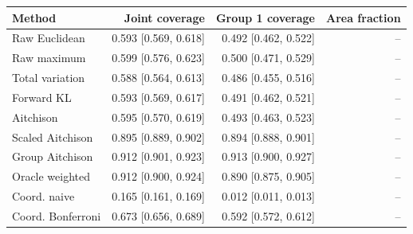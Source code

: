 \begin{tabular}{lrrr}
\toprule
Method & Joint coverage & Group 1 coverage & Area fraction \\
\midrule
Raw Euclidean & 0.593 [0.569, 0.618] & 0.492 [0.462, 0.522] & -- \\
Raw maximum & 0.599 [0.576, 0.623] & 0.500 [0.471, 0.529] & -- \\
Total variation & 0.588 [0.564, 0.613] & 0.486 [0.455, 0.516] & -- \\
Forward KL & 0.593 [0.569, 0.617] & 0.491 [0.462, 0.521] & -- \\
Aitchison & 0.595 [0.570, 0.619] & 0.493 [0.463, 0.523] & -- \\
Scaled Aitchison & 0.895 [0.889, 0.902] & 0.894 [0.888, 0.901] & -- \\
Group Aitchison & 0.912 [0.901, 0.923] & 0.913 [0.900, 0.927] & -- \\
Oracle weighted & 0.912 [0.900, 0.924] & 0.890 [0.875, 0.905] & -- \\
Coord. naive & 0.165 [0.161, 0.169] & 0.012 [0.011, 0.013] & -- \\
Coord. Bonferroni & 0.673 [0.656, 0.689] & 0.592 [0.572, 0.612] & -- \\
\bottomrule
\end{tabular}
